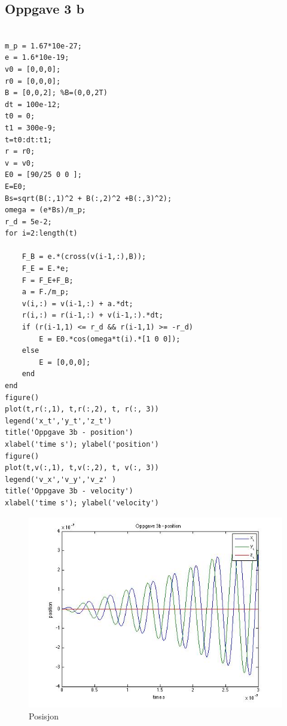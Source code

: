 \documentclass[12pt,a4paper,final,leqno]{report}
\begin{document}
\subsection*{Oppgave 3 b}
\begin{verbatim}

m_p = 1.67*10e-27;
e = 1.6*10e-19;
v0 = [0,0,0];
r0 = [0,0,0];
B = [0,0,2]; %B=(0,0,2T)
dt = 100e-12;
t0 = 0;
t1 = 300e-9;
t=t0:dt:t1;
r = r0;
v = v0;
E0 = [90/25 0 0 ];
E=E0;
Bs=sqrt(B(:,1)^2 + B(:,2)^2 +B(:,3)^2); 
omega = (e*Bs)/m_p;
r_d = 5e-2;
for i=2:length(t)
    
    F_B = e.*(cross(v(i-1,:),B));
    F_E = E.*e;
    F = F_E+F_B;
    a = F./m_p;
    v(i,:) = v(i-1,:) + a.*dt;
    r(i,:) = r(i-1,:) + v(i-1,:).*dt;
    if (r(i-1,1) <= r_d && r(i-1,1) >= -r_d)
        E = E0.*cos(omega*t(i).*[1 0 0]);
    else
        E = [0,0,0];
    end
end
figure()
plot(t,r(:,1), t,r(:,2), t, r(:, 3))
legend('x_t','y_t','z_t')
title('Oppgave 3b - position')
xlabel('time s'); ylabel('position')
figure()
plot(t,v(:,1), t,v(:,2), t, v(:, 3))
legend('v_x','v_y','v_z' )
title('Oppgave 3b - velocity')
xlabel('time s'); ylabel('velocity')

\end{verbatim}
\begin{figure}[H]
\caption{Posisjon}
\centering
\includegraphics[width=\textwidth]{oppgave3br.jpg}
\end{figure}
\end{document}
